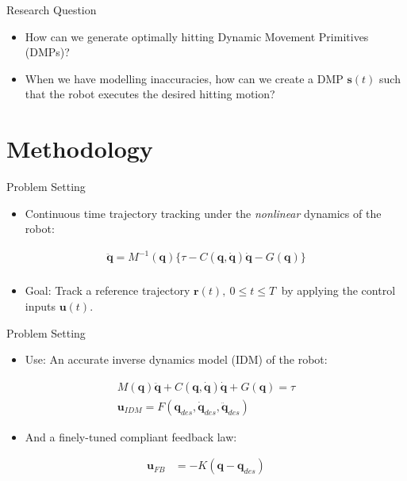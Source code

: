\documentclass{beamer}
\newcommand{\joint}{\mathbf{q}} %
\newcommand{\traj}{\mathbf{r}} %
\newcommand{\dmp}{\mathbf{s}} %
\newcommand{\sysInput}{\mathbf{u}} %
\begin{document}
%
\begin{frame}{Research Question}
\begin{itemize}
\item How can we generate optimally hitting Dynamic Movement Primitives (DMPs)? \pause
\item When we have modelling inaccuracies, how can we create a DMP $\dmp(t)$ such that the robot executes the desired hitting motion?
\end{itemize}
\end{frame}
%
\section{Methodology}
%
\begin{frame}{Problem Setting}
\begin{itemize}
\item Continuous time trajectory tracking under the \emph{nonlinear} dynamics of the robot: \pause
\end{itemize}
\begin{equation*}
\begin{aligned}
\ddot{\joint} = M^{-1}(\joint)\{ \tau - C(\joint,\dot{\joint})\dot{\joint} - G(\joint) \}\\
\end{aligned}
\end{equation*} \pause
\begin{itemize}
\item Goal: Track a reference trajectory $\traj(t), \ 0 \leq t \leq T \ $ by applying the control inputs $\sysInput(t)$.
\end{itemize}
\end{frame}
%
\begin{frame}{Problem Setting}
\begin{itemize}
\item Use: An accurate inverse dynamics model (IDM) of the robot: \pause
\end{itemize}
\begin{equation*}
\begin{aligned}
M(\joint)\ddot{\joint} + C(\joint,\dot{\joint})\dot{\joint} + G(\joint) = \tau \\
\sysInput_{IDM} = F(\joint_{des},\dot{\joint}_{des},\ddot{\joint}_{des})
\end{aligned}
\end{equation*}
\pause 
\begin{itemize}
\item And a finely-tuned compliant feedback law: \pause
\end{itemize}
\begin{equation*}
\begin{aligned}
\sysInput_{FB} &= -K(\joint - \joint_{des})
\end{aligned}
\end{equation*}
\end{frame}
\end{document}
